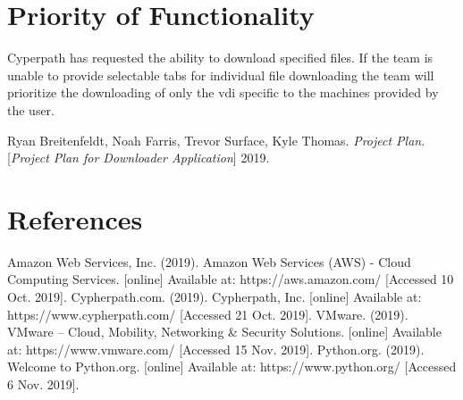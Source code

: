 \documentclass{article}
\begin{document}
    \section{Priority of Functionality}
    Cyperpath has requested the ability to download specified files. If the team is unable to provide selectable tabs for individual file downloading the team will prioritize the downloading of only the vdi specific
    to the machines provided by the user.



    \newpage
    \begin{thebibliography}{1}
    Ryan Breitenfeldt, Noah Farris, Trevor Surface, Kyle Thomas.
    \textit{Project Plan}.
    [\textit{Project Plan for Downloader Application}] 2019.
    \end{thebibliography}


    \section{References}
    Amazon Web Services, Inc. (2019). Amazon Web Services (AWS) - Cloud Computing Services. [online] Available at: https://aws.amazon.com/ [Accessed 10 Oct. 2019].
    Cypherpath.com. (2019). Cypherpath, Inc. [online] Available at: https://www.cypherpath.com/ [Accessed 21 Oct. 2019].
    VMware. (2019). VMware – Cloud, Mobility, Networking \& Security Solutions. [online] Available at: https://www.vmware.com/ [Accessed 15 Nov. 2019].
    Python.org. (2019). Welcome to Python.org. [online] Available at: https://www.python.org/ [Accessed 6 Nov. 2019].

\end{document}
